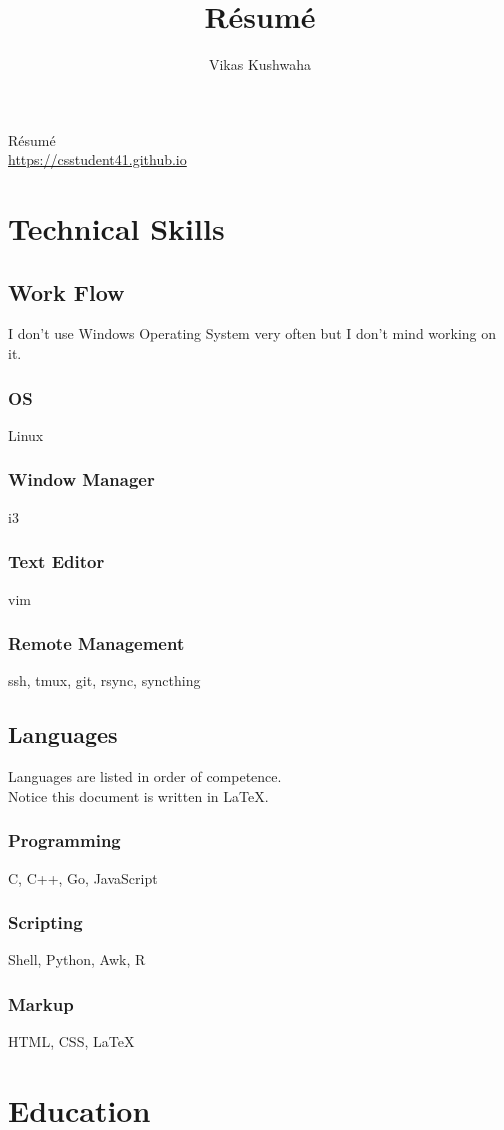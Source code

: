 \documentclass[14pt]{extarticle}
\title{R\'esum\'e}
\author{Vikas Kushwaha}
\renewcommand{\maketitle}{
	\begin{center}
		{\huge\bfseries
		\theauthor}

		\vspace{.25em}

		R\'esum\'e\\
		\url{https://csstudent41.github.io}
	\end{center}
}
\begin{document}
\maketitle


\section{Technical Skills}

\subsection{Work Flow}
I don't use Windows Operating System very often but I don't mind working on it.
\subsubsection{OS} Linux
\subsubsection{Window Manager} i3
\subsubsection{Text Editor} vim
\subsubsection{Remote Management} ssh, tmux, git, rsync, syncthing

\subsection{Languages}
Languages are listed in order of competence.\\
Notice this document is written in {\LaTeX}.
\subsubsection{Programming}
C, C++, Go, JavaScript
\subsubsection{Scripting}
Shell, Python, Awk, R
\subsubsection{Markup}
HTML, CSS, {\LaTeX}


\section{Education}
\end{document}
